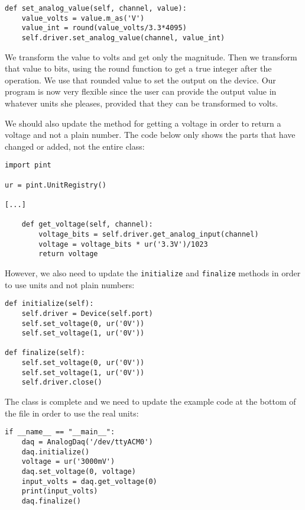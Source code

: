 \begin{verbatim}
def set_analog_value(self, channel, value):
    value_volts = value.m_as('V')
    value_int = round(value_volts/3.3*4095)
    self.driver.set_analog_value(channel, value_int)
\end{verbatim}

We transform the value to volts and get only the magnitude. Then we transform that value to bits, using the round function to get a true integer after the operation. We use that rounded value to set the output on the device. Our program is now very flexible since the user can provide the output value in whatever units she pleases, provided that they can be transformed to volts.


We should also update the method for getting a voltage in order to return a voltage and not a plain number. The code below only shows the parts that have changed or added, not the entire class:

\begin{verbatim}
import pint

ur = pint.UnitRegistry()

[...]

    def get_voltage(self, channel):
        voltage_bits = self.driver.get_analog_input(channel)
        voltage = voltage_bits * ur('3.3V')/1023
        return voltage
\end{verbatim}

However, we also need to update the \texttt{initialize} and \texttt{finalize} methods in order to use units and not plain numbers:

\begin{verbatim}
def initialize(self):
    self.driver = Device(self.port)
    self.set_voltage(0, ur('0V'))
    self.set_voltage(1, ur('0V'))

def finalize(self):
    self.set_voltage(0, ur('0V'))
    self.set_voltage(1, ur('0V'))
    self.driver.close()
\end{verbatim}

The class is complete and we need to update the example code at the bottom of the file in order to use the real units:

\begin{verbatim}
if __name__ == "__main__":
    daq = AnalogDaq('/dev/ttyACM0')
    daq.initialize()
    voltage = ur('3000mV')
    daq.set_voltage(0, voltage)
    input_volts = daq.get_voltage(0)
    print(input_volts)
    daq.finalize()
\end{verbatim}


